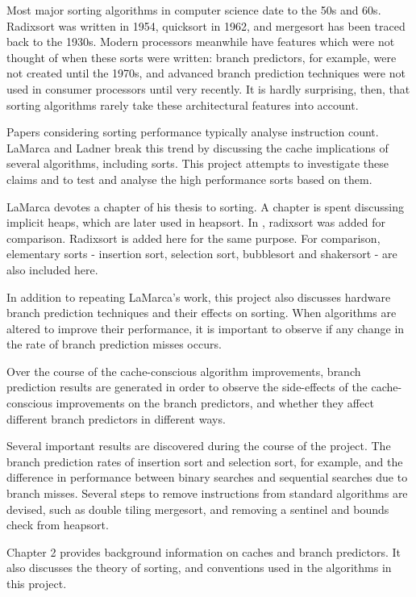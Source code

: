Most major sorting algorithms in computer science date to the 50s and 60s.
Radixsort was written in 1954, quicksort in 1962, and mergesort has been traced
back to the 1930s. Modern processors meanwhile have features which were not
thought of when these sorts were written: branch predictors, for example, were
not created until the 1970s, and advanced branch prediction techniques were
not used in consumer processors until very recently. It is hardly surprising,
then, that sorting algorithms rarely take these architectural features into
account.

Papers considering sorting performance typically analyse instruction count.
LaMarca and Ladner \cite{LaMarca96} break this trend by discussing the cache
implications of several algorithms, including sorts. This project attempts to
investigate these claims and to test and analyse the high performance sorts
based on them.

LaMarca devotes a chapter of his thesis to sorting. A chapter is spent
discussing implicit heaps, which are later used in heapsort. In
\cite{LaMarca99}, radixsort was added for comparison. Radixsort is added here
for the same purpose. For comparison, elementary sorts - insertion sort,
selection sort, bubblesort and shakersort - are also included here.

In addition to repeating LaMarca's work, this project also discusses hardware
branch prediction techniques and their effects on sorting. When algorithms are
altered to improve their performance, it is important to observe if any change
in the rate of branch prediction misses occurs.

Over the course of the cache-conscious algorithm improvements, branch prediction
results are generated in order to observe the side-effects of the
cache-conscious improvements on the branch predictors, and whether they affect
different branch predictors in different ways. 

Several important results are discovered during the course of the project. The
branch prediction rates of insertion sort and selection sort, for example, and
the difference in performance between binary searches and sequential searches due
to branch misses. Several steps to remove instructions from standard algorithms
are devised, such as double tiling mergesort, and removing a sentinel and bounds
check from heapsort.

Chapter 2 provides background information on caches and branch predictors. It
also discusses the theory of sorting, and conventions used in the algorithms in
this project.

